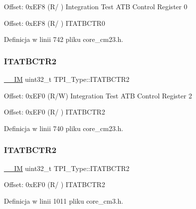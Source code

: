 Offset\+: 0x\+E\+F8 (R/ ) Integration Test A\+TB Control Register 0

Offset\+: 0x\+E\+F8 (R/ ) I\+T\+A\+T\+B\+C\+T\+R0 

Definicja w linii 742 pliku core\+\_\+cm23.\+h.

\mbox{\label{struct_t_p_i___type_ab358319b969d3fed0f89bbe33e9f1652}} 
\subsubsection{\texorpdfstring{I\+T\+A\+T\+B\+C\+T\+R2}{ITATBCTR2}\hspace{0.1cm}{\footnotesize\ttfamily [1/2]}}
{\footnotesize\ttfamily \hyperlink{core__sc300_8h_a4cc1649793116d7c2d8afce7a4ffce43}{\+\_\+\+\_\+\+IM} uint32\+\_\+t T\+P\+I\+\_\+\+Type\+::\+I\+T\+A\+T\+B\+C\+T\+R2}

Offset\+: 0x\+E\+F0 (R/W) Integration Test A\+TB Control Register 2

Offset\+: 0x\+E\+F0 (R/ ) I\+T\+A\+T\+B\+C\+T\+R2 

Definicja w linii 740 pliku core\+\_\+cm23.\+h.

\mbox{\label{struct_t_p_i___type_ab358319b969d3fed0f89bbe33e9f1652}} 
\subsubsection{\texorpdfstring{I\+T\+A\+T\+B\+C\+T\+R2}{ITATBCTR2}\hspace{0.1cm}{\footnotesize\ttfamily [2/2]}}
{\footnotesize\ttfamily \hyperlink{core__sc300_8h_a4cc1649793116d7c2d8afce7a4ffce43}{\+\_\+\+\_\+\+IM} uint32\+\_\+t T\+P\+I\+\_\+\+Type\+::\+I\+T\+A\+T\+B\+C\+T\+R2}

Offset\+: 0x\+E\+F0 (R/ ) I\+T\+A\+T\+B\+C\+T\+R2 

Definicja w linii 1011 pliku core\+\_\+cm3.\+h.

\mbox{\label{struct_t_p_i___type_aaa4c823c10f115f7517c82ef86a5a68d}} 
